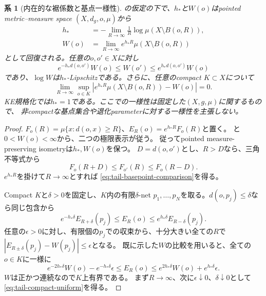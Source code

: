 \documentclass[11pt,a4paper]{ltjsarticle}
\theoremstyle{plain}
\newtheorem{corollary}[corollary]{系}
\theoremstyle{definition}
\theoremstyle{remark}
\begin{document}
\begin{corollary}[内在的な裾係数と基点一様性]
\label{cor:tail-intrinsic-uniform}
の仮定の下で、$h_*$と$W(o)$はpointed metric--measure space
$(X,d_g,o,\mu)$から
\begin{align}
 h_*&=-\lim_{R\to\infty}\frac1R
        \log\mu(X\setminus B(o,R)),\label{eq:intrinsic-tail-rate}\\
 W(o)&=\lim_{R\to\infty}e^{h_*R}
        \mu(X\setminus B(o,R))\label{eq:intrinsic-tail-weight}
\end{align}
として回復される。任意の$o,o'\in X$に対し
\begin{equation}
\label{eq:tail-basepoint-comparison}
 e^{-h_*d(o,o')}W(o)\le W(o')\le e^{h_*d(o,o')}W(o)
\end{equation}
であり、$\log W$は$h_*$-Lipschitzである。さらに、任意のcompact $K\subset X$について
\begin{equation}
\label{eq:tail-compact-uniform}
 \lim_{R\to\infty}\sup_{o\in K}
 \left|e^{h_*R}\mu(X\setminus B(o,R))-W(o)\right|=0.
\end{equation}
KE規格化では$h_*=1$である。ここでの一様性は固定した$(X,g,\mu)$に関するもので、
非compactな基点集合や退化parameterに対する一様性を主張しない。
\end{corollary}
\begin{proof}
$F_o(R)=\mu\{x:d(o,x)\ge R\}$、$E_R(o)=e^{h_*R}F_o(R)$と置く。
と$0<W(o)<\infty$から、二つの極限表示が従う。
従ってpointed measure-preserving isometryは$h_*,W(o)$を保つ。
$D=d(o,o')$とし、$R>D$なら、三角不等式から
\[
 F_o(R+D)\le F_{o'}(R)\le F_o(R-D).
\]
$e^{h_*R}$を掛けて$R\to\infty$とすれば
\eqref{eq:tail-basepoint-comparison}を得る。

Compact $K$と$\delta>0$を固定し、$K$内の有限$\delta$-net
$p_1,\ldots,p_N$を取る。$d(o,p_j)\le\delta$なら同じ包含から
\[
 e^{-h_*\delta}E_{R+\delta}(p_j)
 \le E_R(o)\le e^{h_*\delta}E_{R-\delta}(p_j).
\]
任意の$\epsilon>0$に対し、有限個の$p_j$での収束から、十分大きい全ての$R$で
$|E_{R\pm\delta}(p_j)-W(p_j)|\le\epsilon$となる。
既に示した$W$の比較を用いると、全ての$o\in K$に一様に
\[
 e^{-2h_*\delta}W(o)-e^{-h_*\delta}\epsilon
 \le E_R(o)\le
 e^{2h_*\delta}W(o)+e^{h_*\delta}\epsilon.
\]
$W$は正かつ連続なので$K$上有界である。
まず$R\to\infty$、次に$\epsilon\downarrow0$、$\delta\downarrow0$として
\eqref{eq:tail-compact-uniform}を得る。
\end{proof}
\end{document}

